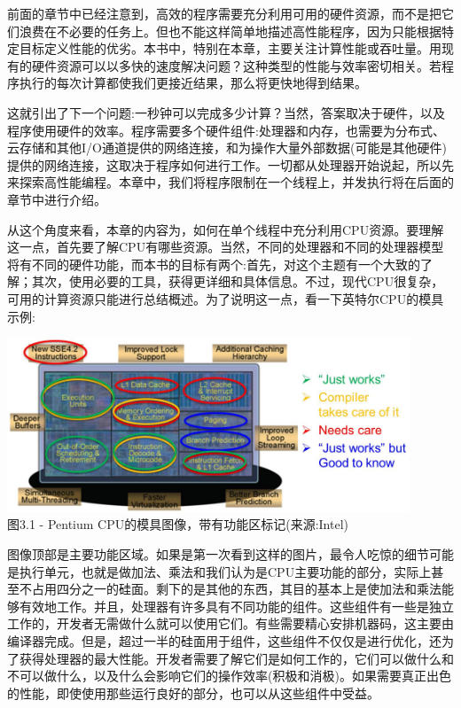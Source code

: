 前面的章节中已经注意到，高效的程序需要充分利用可用的硬件资源，而不是把它们浪费在不必要的任务上。但也不能这样简单地描述高性能程序，因为只能根据特定目标定义性能的优劣。本书中，特别在本章，主要关注计算性能或吞吐量。用现有的硬件资源可以以多快的速度解决问题？这种类型的性能与效率密切相关。若程序执行的每次计算都使我们更接近结果，那么将更快地得到结果。

这就引出了下一个问题:一秒钟可以完成多少计算？当然，答案取决于硬件，以及程序使用硬件的效率。程序需要多个硬件组件:处理器和内存，也需要为分布式、云存储和其他I/O通道提供的网络连接，和为操作大量外部数据(可能是其他硬件)提供的网络连接，这取决于程序如何进行工作。一切都从处理器开始说起，所以先来探索高性能编程。本章中，我们将程序限制在一个线程上，并发执行将在后面的章节中进行介绍。

从这个角度来看，本章的内容为，如何在单个线程中充分利用CPU资源。要理解这一点，首先要了解CPU有哪些资源。当然，不同的处理器和不同的处理器模型将有不同的硬件功能，而本书的目标有两个:首先，对这个主题有一个大致的了解；其次，使用必要的工具，获得更详细和具体信息。不过，现代CPU很复杂，可用的计算资源只能进行总结概述。为了说明这一点，看一下英特尔CPU的模具示例:

\begin{center}
\includegraphics[width=0.9\textwidth]{content/1/chapter3/images/1.jpg}\\
图3.1 - Pentium CPU的模具图像，带有功能区标记(来源:Intel)
\end{center}

图像顶部是主要功能区域。如果是第一次看到这样的图片，最令人吃惊的细节可能是执行单元，也就是做加法、乘法和我们认为是CPU主要功能的部分，实际上甚至不占用四分之一的硅面。剩下的是其他的东西，其目的基本上是使加法和乘法能够有效地工作。并且，处理器有许多具有不同功能的组件。这些组件有一些是独立工作的，开发者无需做什么就可以使用它们。有些需要精心安排机器码，这主要由编译器完成。但是，超过一半的硅面用于组件，这些组件不仅仅是进行优化，还为了获得处理器的最大性能。开发者需要了解它们是如何工作的，它们可以做什么和不可以做什么，以及什么会影响它们的操作效率(积极和消极)。如果需要真正出色的性能，即使使用那些运行良好的部分，也可以从这些组件中受益。

